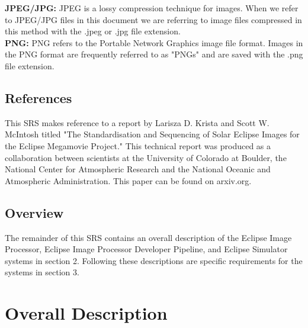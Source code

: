\documentclass[10pt, onecolumn, draftclsnofoot, letterpaper, compsoc]{IEEEtran}
\begin{document}
	\noindent \textbf{JPEG/JPG:}
	JPEG is a lossy compression technique for images. When we refer
	to JPEG/JPG files in this document we are referring to image files
	compressed in this method with the .jpeg or .jpg file extension. \\

	\noindent \textbf{PNG:}
	PNG refers to the Portable Network Graphics image file format.
	Images in the PNG format are frequently referred to as "PNGs" and are
	saved with the .png file extension.


\subsection{References}

This SRS makes reference to a report by Larisza D. Krista and Scott W.
McIntosh titled "The Standardisation and Sequencing of Solar Eclipse Images for
the Eclipse Megamovie Project." This technical report was produced as a
collaboration between scientists at the University of Colorado at Boulder, the
National Center for Atmospheric Research and the National Oceanic and
Atmospheric Administration. This paper can be found on arxiv.org.

\subsection{Overview}

The remainder of this SRS contains an overall description of the Eclipse Image
Processor, Eclipse Image Processor Developer Pipeline, and Eclipse Simulator
systems in section 2. Following these descriptions are specific requirements
for the systems in section 3.

\newpage
\section{Overall Description}
\end{document}
